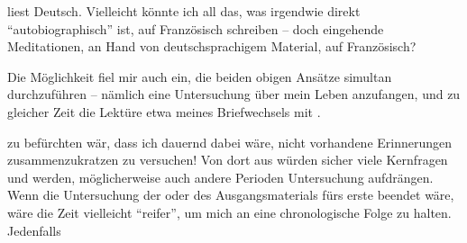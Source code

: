 liest Deutsch. Vielleicht könnte ich all das, was irgendwie direkt ``autobiographisch'' ist, auf Französisch schreiben -- doch eingehende Meditationen,  an Hand von deutschsprachigem Material, auf Französisch?

Die Möglichkeit fiel mir auch ein, die beiden obigen Ansätze simultan durchzuführen -- nämlich eine  Untersuchung über mein Leben  anzufangen, und zu gleicher Zeit die Lektüre etwa meines Briefwechsels mit .

zu befürchten wär, dass ich dauernd dabei wäre, nicht vorhandene Erinnerungen zusammenzukratzen zu versuchen! Von dort aus würden  sicher viele Kernfragen   und    werden, möglicherweise auch andere Perioden   Untersuchung aufdrängen. Wenn die Untersuchung der  oder des Ausgangsmaterials fürs erste beendet wäre, wäre die Zeit vielleicht ``reifer'', um mich an eine chronologische Folge zu halten. Jedenfalls
